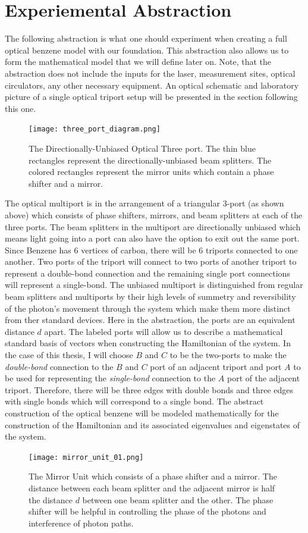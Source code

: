 \section{Experiemental Abstraction}
The following abstraction is what one should experiment when creating a full optical benzene model with our foundation. This abstraction also allows us to form the mathematical model that we will define later on. Note, that the abstraction does not include the inputs for the laser, measurement sites, optical circulators, any other necessary equipment. An optical schematic and laboratory picture of a single optical triport setup will be presented in the section following this one. \newline
\begin{figure}[H]
    \centering
    \texttt{[image: three\_port\_diagram.png]}
    \caption{The Directionally-Unbiased Optical Three port. The thin blue rectangles represent the directionally-unbiased beam splitters. The colored rectangles represent the mirror units which contain a phase shifter and a mirror.}
    \label{fig:my_label}
\end{figure}
\indent The optical multiport is in the arrangement of a triangular 3-port (as shown above) which consists of phase shifters, mirrors, and beam splitters at each of the three ports. The beam splitters in the multiport are directionally unbiased which means light going into a port can also have the option to exit out the same port. Since Benzene has 6 vertices of carbon, there will be 6 triports connected to one another. Two ports of the triport will connect to two ports of another triport to represent a double-bond connection and the remaining single port connections will represent a single-bond. 
The unbiased multiport is distinguished from regular beam splitters and multiports by their high levels of summetry and reversibility of the photon's movement through the system which make them more distinct from ther standard devices. Here in the abstraction, the ports are an equivalent distance $d$ apart. The labeled ports will allow us to describe a mathematical standard basis of vectors when constructing the Hamiltonian of the system. In the case of this thesis, I will choose $B$ and $C$ to be the two-ports to make the \textit{double-bond} connection to the $B$ and $C$ port of an adjacent triport and port $A$ to be used for representing the \textit{single-bond} connection to the $A$ port of the adjacent triport. Therefore, there will be three edges with double bonds and three edges with single bonds which will correspond to a single bond. The abstract construction of the optical benzene will be modeled mathematically for the construction of the Hamiltonian and its associated eigenvalues and eigenstates of the system. 
\begin{figure}[H]
    \centering
    \texttt{[image: mirror\_unit\_01.png]}
    \caption{The Mirror Unit which consists of a phase shifter and a mirror. The distance between each beam splitter and the adjacent mirror is half the distance $d$ between one beam splitter and the other. The phase shifter will be helpful in controlling the phase of the photons and interference of photon paths.}
    \label{fig:my_label}
\end{figure}

